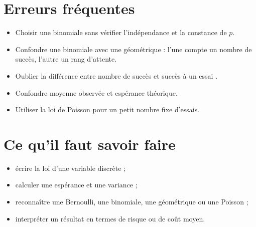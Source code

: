 \section{Erreurs fréquentes}

\begin{itemize}
    \item Choisir une binomiale sans vérifier l'indépendance et la constance de $p$.
    \item Confondre une binomiale avec une géométrique : l'une compte un nombre de succès, l'autre un rang d'attente.
    \item Oublier la différence entre \og nombre de succès \fg{} et \og succès à un essai \fg.
    \item Confondre moyenne observée et espérance théorique.
    \item Utiliser la loi de Poisson pour un petit nombre fixe d'essais.
\end{itemize}

\section{Ce qu'il faut savoir faire}

\begin{itemize}
    \item écrire la loi d'une variable discrète ;
    \item calculer une espérance et une variance ;
    \item reconnaître une Bernoulli, une binomiale, une géométrique ou une Poisson ;
    \item interpréter un résultat en termes de risque ou de coût moyen.
\end{itemize}

